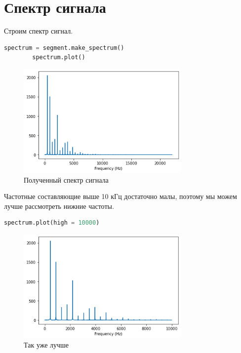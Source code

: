 \documentclass[a4paper, 12pt]{report}
\begin{document}
	\chapter{Спектр сигнала}
	Строим спектр сигнал.
	\begin{lstlisting}[language=Python,caption=Спектр сигнала]
		spectrum = segment.make_spectrum()
		spectrum.plot()
	\end{lstlisting}
	\begin{figure}[H]
		\centering
		\includegraphics[width=0.75\textwidth]{spectrum1.png}
		\caption{Полученный спектр сигнала}
		\label{fig:spectrum1}
	\end{figure}
	Частотные составляющие выше 10 кГц достаточно малы, поэтому мы можем лучше рассмотреть нижние частоты.
	\begin{lstlisting}[language=Python,caption=Улучшаем масштаб]
		spectrum.plot(high = 10000)
	\end{lstlisting}
	\begin{figure}[H]
		\centering
		\includegraphics[width=0.75\textwidth]{spectrum2.png}
		\caption{Так уже лучше}
		\label{fig:spectrum2}
	\end{figure}
\end{document}

